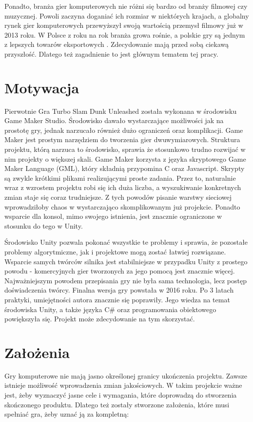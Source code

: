 \documentclass[a4paper,12pt,twoside,openany]{report}
\begin{document}
Ponadto, branża gier komputerowych nie różni się bardzo od branży filmowej czy muzycznej. Powoli zaczyna doganiać ich rozmiar w niektórych krajach, a globalny rynek gier komputerowych przewyższył swoją wartością przemysł filmowy już w 2013 roku. W Polsce z roku na rok branża growa rośnie, a polskie gry są jednym z lepszych towarów eksportowych \cite{canalplus_gry}. Zdecydowanie mają przed sobą ciekawą przyszłość. Dlatego też zagadnienie to jest głównym tematem tej pracy. 

\section{Motywacja}
Pierwotnie Gra Turbo Slam Dunk Unleashed została wykonana w środowisku Game Maker Studio. Środowisko dawało wystarczające możliwości jak na prostotę gry, jednak narzucało również dużo ograniczeń oraz komplikacji. Game Maker jest prostym narzędziem do tworzenia gier dwuwymiarowych. Struktura projektu, którą narzuca to środowisko, sprawia że stosunkowo trudno rozwijać w nim projekty o większej skali. Game Maker korzysta z języka skryptowego Game Maker Language (GML), który składnią przypomina C oraz Javascript. Skrypty są zwykle krótkimi plikami realizującymi proste zadania. Przez to, naturalnie wraz z wzrostem projektu robi się ich duża liczba, a wyszukiwanie konkretnych zmian staje się coraz trudniejsze. Z tych powodów pisanie warstwy sieciowej wprowadziłoby chaos w wystarczająco skomplikowanym już projekcie.  Ponadto wsparcie dla konsol, mimo swojego istnienia, jest znacznie ograniczone w stosunku do tego w Unity.

Środowisko Unity pozwala pokonać wszystkie te problemy i sprawia, że pozostałe problemy algorytmiczne, jak i projektowe mogą zostać łatwiej rozwiązane. Wsparcie samych twórców silnika jest stabilniejsze w przypadku Unity z prostego powodu - komercyjnych gier tworzonych za jego pomocą jest znacznie więcej. Najważniejszym powodem przepisania gry nie była sama technologia, lecz postęp doświadczenia twórcy. Finalna wersja gry powstała w 2016 roku. Po 3 latach praktyki, umiejętności autora znacznie się poprawiły. Jego wiedza na temat środowiska Unity, a także języka C\# oraz programowania obiektowego powiększyła się. Projekt może zdecydowanie na tym skorzystać. 

\section{Założenia}
Gry komputerowe nie mają jasno określonej granicy ukończenia projektu. Zawsze istnieje możliwość wprowadzenia zmian jakościowych. W takim projekcie ważne jest, żeby wyznaczyć jasne cele i wymagania, które doprowadzą do stworzenia skończonego produktu. Dlatego też zostały stworzone założenia, które musi spełniać gra, żeby uznać ją za kompletną:
\end{document}
